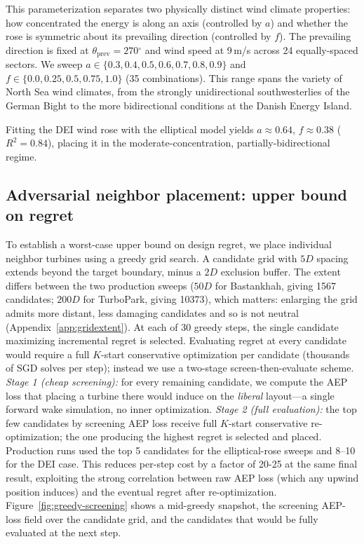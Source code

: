 \documentclass[wes, manuscript]{copernicus}
\begin{document}
This parameterization separates two physically distinct wind climate properties: how concentrated the energy is along an axis (controlled by $a$) and whether the rose is symmetric about its prevailing direction (controlled by $f$).
The prevailing direction is fixed at $\theta_\text{prev} = 270$$^\circ$ and wind speed at 9\,m/s across 24 equally-spaced sectors.
We sweep $a \in \{0.3, 0.4, 0.5, 0.6, 0.7, 0.8, 0.9\}$ and $f \in \{0.0, 0.25, 0.5, 0.75, 1.0\}$ (35 combinations).
This range spans the variety of North Sea wind climates, from the strongly unidirectional southwesterlies of the German Bight to the more bidirectional conditions at the Danish Energy Island.

Fitting the DEI wind rose with the elliptical model yields $a \approx 0.64$, $f \approx 0.38$ ($R^2 = 0.84$), placing it in the moderate-concentration, partially-bidirectional regime.

\subsection{Adversarial neighbor placement: upper bound on regret}

To establish a worst-case upper bound on design regret, we place individual neighbor turbines using a greedy grid search.
A candidate grid with $5D$ spacing extends beyond the target boundary, minus a $2D$ exclusion buffer. The extent differs between the two production sweeps ($50D$ for Bastankhah, giving 1567 candidates; $200D$ for TurboPark, giving 10373), which matters: enlarging the grid admits more distant, less damaging candidates and so is not neutral (Appendix~\ref{app:gridextent}).
At each of 30 greedy steps, the single candidate maximizing incremental regret is selected.
Evaluating regret at every candidate would require a full $K$-start conservative optimization per candidate (thousands of SGD solves per step); instead we use a two-stage screen-then-evaluate scheme.
\emph{Stage 1 (cheap screening):} for every remaining candidate, we compute the AEP loss that placing a turbine there would induce on the \emph{liberal} layout---a single forward wake simulation, no inner optimization.
\emph{Stage 2 (full evaluation):} the top few candidates by screening AEP loss receive full $K$-start conservative re-optimization; the one producing the highest regret is selected and placed. Production runs used the top 5 candidates for the elliptical-rose sweeps and 8--10 for the DEI case.
This reduces per-step cost by a factor of 20-25 at the same final result, exploiting the strong correlation between raw AEP loss (which any upwind position induces) and the eventual regret after re-optimization.
Figure~\ref{fig:greedy-screening} shows a mid-greedy snapshot, the screening AEP-loss field over the candidate grid, and the candidates that would be fully evaluated at the next step.
\end{document}
